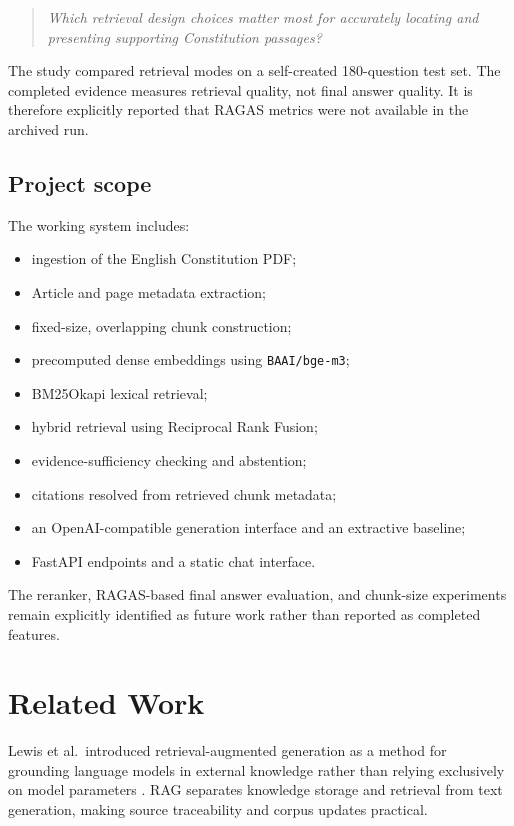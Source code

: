 \documentclass[11pt]{article}
\begin{document}
\begin{quote}
\emph{Which retrieval design choices matter most for accurately locating and presenting supporting Constitution passages?}
\end{quote}

The study compared retrieval modes on a self-created 180-question test set. The completed evidence measures retrieval quality, not final answer quality. It is therefore explicitly reported that RAGAS \cite{Ragas2024} metrics were not available in the archived run.

\subsection{Project scope}

The working system includes:
\begin{itemize}[nosep]
  \item ingestion of the English Constitution PDF;
  \item Article and page metadata extraction;
  \item fixed-size, overlapping chunk construction;
  \item precomputed dense embeddings using \texttt{BAAI/bge-m3};
  \item BM25Okapi lexical retrieval;
  \item hybrid retrieval using Reciprocal Rank Fusion;
  \item evidence-sufficiency checking and abstention;
  \item citations resolved from retrieved chunk metadata;
  \item an OpenAI-compatible generation interface and an extractive baseline;
  \item FastAPI endpoints and a static chat interface.
\end{itemize}

The reranker, RAGAS-based final answer evaluation, and chunk-size experiments remain explicitly identified as future work rather than reported as completed features.

\section{Related Work}

Lewis et al.\ introduced retrieval-augmented generation as a method for grounding language models in external knowledge rather than relying exclusively on model parameters \cite{Lewis2020}. RAG separates knowledge storage and retrieval from text generation, making source traceability and corpus updates practical.
\end{document}
